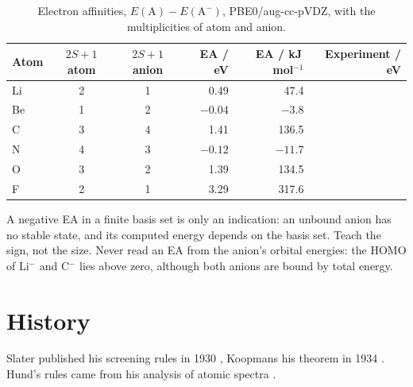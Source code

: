 \begin{table}[htb]
	\centering\small
	\caption{Electron affinities, $E(\mathrm{A}) - E(\mathrm{A}^-)$, PBE0/aug-cc-pVDZ, with the multiplicities of atom and anion.}
	\label{tab:pt-ea}
	\begin{tabular}{l cc rr r}
		\hline
		Atom & $2S+1$ atom & $2S+1$ anion & EA / eV & EA / kJ\,mol$^{-1}$ & Experiment / eV \\
		\hline
		Li & 2 & 1 &  0.49 &  47.4 & \XXX \\
		Be & 1 & 2 & $-0.04$ & $-3.8$ & \XXX \\
		C  & 3 & 4 &  1.41 & 136.5 & \XXX \\
		N  & 4 & 3 & $-0.12$ & $-11.7$ & \XXX \\
		O  & 3 & 2 &  1.39 & 134.5 & \XXX \\
		F  & 2 & 1 &  3.29 & 317.6 & \XXX \\
		\hline
	\end{tabular}
\end{table}

A negative EA in a finite basis set is only an indication: an unbound anion has no stable state, and its computed energy depends on the basis set. Teach the sign, not the size. Never read an EA from the anion's orbital energies: the HOMO of Li$^-$ and C$^-$ lies above zero, although both anions are bound by total energy.

\section{History}
Slater published his screening rules in 1930 \cite{slater1930}, Koopmans his theorem in 1934 \cite{koopmans1934}. Hund's rules came from his analysis of atomic spectra .
